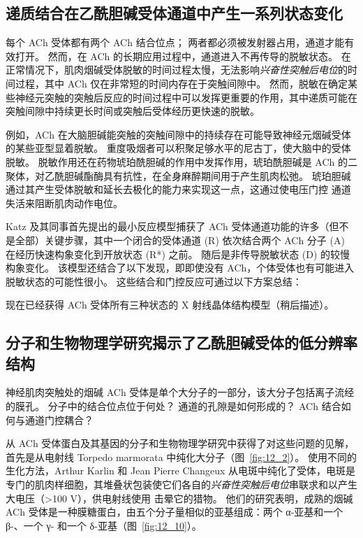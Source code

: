 \subsection{递质结合在乙酰胆碱受体通道中产生一系列状态变化}

每个 ACh 受体都有两个 ACh 结合位点；
两者都必须被发射器占用，通道才能有效打开。
然而，在 ACh 的长期应用过程中，通道进入不再传导的脱敏状态。
在正常情况下，肌肉烟碱受体脱敏的时间过程太慢，无法影响\textit{兴奋性突触后电位}的时间过程，其中 ACh 仅在非常短的时间内存在于突触间隙中。
然而，脱敏在确定某些神经元突触的突触后反应的时间过程中可以发挥更重要的作用，其中递质可能在突触间隙中持续更长时间或突触后受体经历更快速的脱敏。


例如，ACh 在大脑胆碱能突触的突触间隙中的持续存在可能导致神经元烟碱受体的某些亚型显着脱敏。
重度吸烟者可以积聚足够水平的尼古丁，使大脑中的受体脱敏。
脱敏作用还在药物琥珀酰胆碱的作用中发挥作用，琥珀酰胆碱是 ACh 的二聚体，对乙酰胆碱酯酶具有抗性，在全身麻醉期间用于产生肌肉松弛。
琥珀胆碱通过其产生受体脱敏和延长去极化的能力来实现这一点，这通过使电压门控  通道失活来阻断肌肉动作电位。


Katz 及其同事首先提出的最小反应模型捕获了 ACh 受体通道功能的许多（但不是全部）关键步骤，其中一个闭合的受体通道 (R) 依次结合两个 ACh 分子 (A) 在经历快速构象变化到开放状态 (R*) 之前。
随后是非传导脱敏状态 (D) 的较慢构象变化。
该模型还结合了以下发现，即即使没有 ACh，个体受体也有可能进入脱敏状态的可能性很小。
这些结合和门控反应可通过以下方案总结：


现在已经获得 ACh 受体所有三种状态的 X 射线晶体结构模型（稍后描述）。



\subsection{分子和生物物理学研究揭示了乙酰胆碱受体的低分辨率结构}

神经肌肉突触处的烟碱 ACh 受体是单个大分子的一部分，该大分子包括离子流经的膜孔。
分子中的结合位点位于何处？ 通道的孔隙是如何形成的？ ACh 结合如何与通道门控耦合？


从 ACh 受体蛋白及其基因的分子和生物物理学研究中获得了对这些问题的见解，首先是从电射线 Torpedo marmorata 中纯化大分子（图~\ref{fig:12_2}）。
使用不同的生化方法，Arthur Karlin 和 Jean Pierre Changeux 从电斑中纯化了受体，电斑是专门的肌肉样细胞，其堆叠状包装使它们各自的\textit{兴奋性突触后电位}串联求和以产生大电压（>100 V），供电射线使用 击晕它的猎物。
他们的研究表明，成熟的烟碱 ACh 受体是一种膜糖蛋白，由五个分子量相似的亚基组成：两个 α-亚基和一个 β-、一个 γ- 和一个 δ-亚基（图~\ref{fig:12_10}）。


